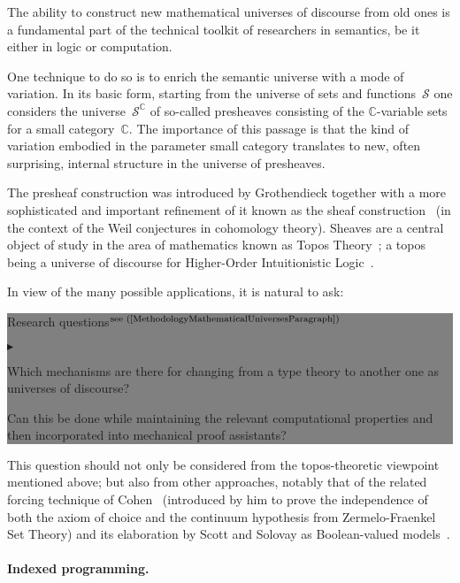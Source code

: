 \documentclass[11pt,twocolumn]{article}
\newenvironment{btritemize}
  {\begin{list}{\btr}
  {\setlength{\topsep}{2pt}
   \setlength{\partopsep}{2pt}
   \setlength{\itemsep}{2.5pt}
   \setlength{\parsep}{2.5pt}
   \setlength{\leftmargin}{1em}
   \setlength{\labelwidth}{.5em}}}
  {\end{list}}
\newcommand{\mytextsf}[1]{\textsf{\small #1}}
\newcommand{\btr}{$\blacktriangleright$}
\newcommand{\reqpsize}{8.113395cm}%
\newcommand{\reqs}[2]{\begin{center}\colorbox{grey}{\begin{minipage}{\reqpsize}
  \mytextsf{Research questions}\hfill$^{\mbox{\scriptsize see #1 }}$\\[-5.5mm]
  \begin{btritemize}
  \item #2
  \end{btritemize}
\end{minipage}}\end{center}}
\newcommand{\Set}{{\boldsymbol{\mathscr S}}}
\newcommand{\scat}[1]{\mathbb{#1}}
\begin{document}
The ability to construct new mathematical universes of discourse from old ones
is a fundamental part of the technical toolkit of researchers in semantics, be
it either in logic or computation.

One technique to do so is to enrich the semantic universe with a mode of
variation.  In its basic form, starting from the universe of sets and
functions~$\Set$ one considers the universe~$\Set^{\scat C}$ of so-called
presheaves consisting of the \mbox{$\scat C$-variable} sets for a small
category~$\scat C$.  The importance of this passage is that the kind of
variation embodied in the parameter small category translates to new, often
surprising, internal structure in the universe of presheaves.  

The presheaf construction was introduced by Grothendieck together with a
more sophisticated and important refinement of it known as the sheaf
construction~\cite{SGA4} (in the context of the Weil conjectures in
cohomology theory).  Sheaves are a central object of study in the area of
mathematics known as Topos Theory~\cite{Elephant}; a topos being a
universe of discourse for Higher-Order Intuitionistic
Logic~\cite{LambekScott}.  

In view of the many possible applications, it is natural to ask:
\reqs{(\ref{MethodologyMathematicalUniversesParagraph})}
  {Which mechanisms are there for changing from a type theory to another one
    as universes of discourse? 

    Can this be done while maintaining the relevant computational properties
    and then incorporated into mechanical proof assistants?}

This question should not only be considered from the topos-theoretic viewpoint
mentioned above; but also from other approaches, notably that of the related
forcing technique of Cohen~\cite{Cohen} (introduced by him to prove the
independence of both the axiom of choice and the continuum hypothesis from
Zermelo-Fraenkel Set Theory) and its elaboration by Scott and Solovay as
Boolean-valued models~\cite{ScottSolovay}.


\paragraph{Indexed programming.}
\label{IndexedProgrammingIntro}
\end{document}
